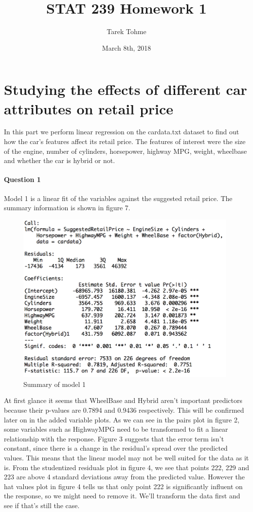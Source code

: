 \documentclass{article}
\begin{document}
\title{STAT 239 Homework 1}
\author{Tarek Tohme}
\date{March 8th, 2018}
\maketitle


\section{Studying the effects of different car attributes on retail price}

In this part we perform linear regression on the cardata.txt dataset to find out how the car's features affect its retail price. The features of interest were the size of the engine, number of cylinders, horsepower, highway MPG, weight, wheelbase and whether the car is hybrid or not. 

\paragraph{Question 1}

Model 1 is a linear fit of the variables against the suggested retail price. The summary information is shown in figure 7.

\begin{figure}[h]				%
	\centering
	\includegraphics[width=11cm]{Part1_summary_model1}
	\caption{Summary of model 1}
\end{figure}

At first glance it seems that WheelBase and Hybrid aren't important predictors because their p-values are 0.7894 and 0.9436 respectively. This will be confirmed later on in the added variable plots. As we can see in the pairs plot in figure 2, some variables such as HighwayMPG need to be transformed to fit a linear relationship with the response. Figure 3 suggests that the error term isn't constant, since there is a change in the residual's spread over the predicted values. This means that the linear model may not be well suited for the data as it is. From the studentized residuals plot in figure 4, we see that points 222, 229 and 223 are above 4 standard deviations away from the predicted value. However the hat values plot in figure 4 tells us that only point 222 is significantly influent on the response, so we might need to remove it. We'll transform the data first and see if that's still the case.
\end{document}
